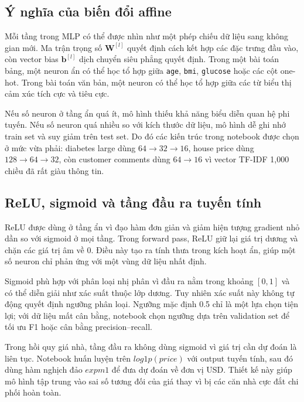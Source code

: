 \documentclass[12pt,a4paper]{report}
\begin{document}
\subsection{Ý nghĩa của biến đổi affine}
Mỗi tầng trong MLP có thể được nhìn như một phép chiếu dữ liệu sang không gian mới.
Ma trận trọng số $\mathbf{W}^{[l]}$ quyết định cách kết hợp các đặc trưng đầu vào, còn vector bias $\mathbf{b}^{[l]}$ dịch chuyển siêu phẳng quyết định.
Trong một bài toán bảng, một neuron ẩn có thể học tổ hợp giữa \texttt{age}, \texttt{bmi}, \texttt{glucose} hoặc các cột one-hot.
Trong bài toán văn bản, một neuron có thể học tổ hợp giữa các từ biểu thị cảm xúc tích cực và tiêu cực.

Nếu số neuron ở tầng ẩn quá ít, mô hình thiếu khả năng biểu diễn quan hệ phi tuyến.
Nếu số neuron quá nhiều so với kích thước dữ liệu, mô hình dễ ghi nhớ train set và suy giảm trên test set.
Do đó các kiến trúc trong notebook được chọn ở mức vừa phải: diabetes large dùng $64 \to 32 \to 16$, house price dùng $128 \to 64 \to 32$, còn customer comments dùng $64 \to 16$ vì vector TF-IDF 1,000 chiều đã rất giàu thông tin.

\subsection{ReLU, sigmoid và tầng đầu ra tuyến tính}
ReLU được dùng ở tầng ẩn vì đạo hàm đơn giản và giảm hiện tượng gradient nhỏ dần so với sigmoid ở mọi tầng.
Trong forward pass, ReLU giữ lại giá trị dương và chặn các giá trị âm về 0.
Điều này tạo ra tính thưa trong kích hoạt ẩn, giúp một số neuron chỉ phản ứng với một vùng dữ liệu nhất định.

Sigmoid phù hợp với phân loại nhị phân vì đầu ra nằm trong khoảng $[0,1]$ và có thể diễn giải như xác suất thuộc lớp dương.
Tuy nhiên xác suất này không tự động quyết định ngưỡng phân loại.
Ngưỡng mặc định 0.5 chỉ là một lựa chọn tiện lợi; với dữ liệu mất cân bằng, notebook chọn ngưỡng dựa trên validation set để tối ưu F1 hoặc cân bằng precision--recall.

Trong hồi quy giá nhà, tầng đầu ra không dùng sigmoid vì giá trị cần dự đoán là liên tục.
Notebook huấn luyện trên $log1p(price)$ với output tuyến tính, sau đó dùng hàm nghịch đảo $expm1$ để đưa dự đoán về đơn vị USD.
Thiết kế này giúp mô hình tập trung vào sai số tương đối của giá thay vì bị các căn nhà cực đắt chi phối hoàn toàn.
\end{document}
